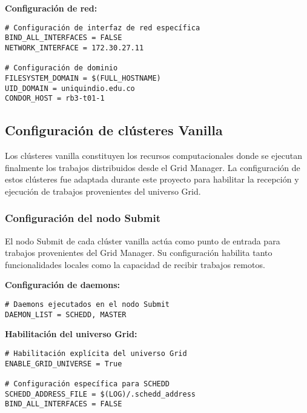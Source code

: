\textbf{Configuración de red:}

\begin{verbatim}
# Configuración de interfaz de red específica
BIND_ALL_INTERFACES = FALSE
NETWORK_INTERFACE = 172.30.27.11

# Configuración de dominio
FILESYSTEM_DOMAIN = $(FULL_HOSTNAME)
UID_DOMAIN = uniquindio.edu.co
CONDOR_HOST = rb3-t01-1
\end{verbatim}

\FloatBarrier\subsection{Configuración de clústeres Vanilla}

Los clústeres vanilla constituyen los recursos computacionales donde se ejecutan finalmente los trabajos distribuidos desde el Grid Manager. La configuración de estos clústeres fue adaptada durante este proyecto para habilitar la recepción y ejecución de trabajos provenientes del universo Grid.

\FloatBarrier\subsubsection{Configuración del nodo Submit}

El nodo Submit de cada clúster vanilla actúa como punto de entrada para trabajos provenientes del Grid Manager. Su configuración habilita tanto funcionalidades locales como la capacidad de recibir trabajos remotos.

\textbf{Configuración de daemons:}

\begin{verbatim}
# Daemons ejecutados en el nodo Submit
DAEMON_LIST = SCHEDD, MASTER
\end{verbatim}

\textbf{Habilitación del universo Grid:}

\begin{verbatim}
# Habilitación explícita del universo Grid
ENABLE_GRID_UNIVERSE = True

# Configuración específica para SCHEDD
SCHEDD_ADDRESS_FILE = $(LOG)/.schedd_address
BIND_ALL_INTERFACES = FALSE
\end{verbatim}

